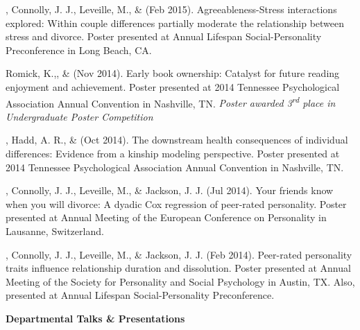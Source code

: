 \begin{etaremune}
\item\meb, Connolly, J. J., Leveille, M., \& \jjj (Feb 2015). Agreeableness-Stress interactions explored: Within couple differences partially moderate the relationship between stress and divorce. Poster presented at Annual Lifespan Social-Personality Preconference in Long Beach, CA.
%
\item Romick, K.,\noteA \meb, \& \joe (Nov 2014). Early book ownership: Catalyst for future reading enjoyment and achievement. Poster presented at 2014 Tennessee Psychological Association Annual Convention in  Nashville, TN. \textit{Poster awarded 3\textsuperscript{rd} place in Undergraduate Poster Competition}
%
\item\meb, Hadd, A. R., \& \joe (Oct 2014). The downstream health consequences of individual differences: Evidence from a kinship modeling perspective. Poster presented at 2014 Tennessee Psychological Association Annual Convention in Nashville, TN.
%


%
\item\meb, Connolly, J. J., Leveille, M., \& Jackson, J. J. (Jul 2014). Your friends know when you will divorce: A dyadic Cox regression of peer-rated personality. Poster presented at Annual Meeting of the European Conference on Personality in Lausanne, Switzerland.
%

%
\item\meb, Connolly, J. J., Leveille, M., \& Jackson, J. J. (Feb 2014). Peer-rated personality traits influence relationship duration and dissolution. Poster presented at Annual Meeting of the Society for Personality and Social Psychology in Austin, TX. Also, presented at Annual Lifespan Social-Personality Preconference.
%

%
\end{etaremune}
{\large \bf Departmental Talks \& Presentations}
